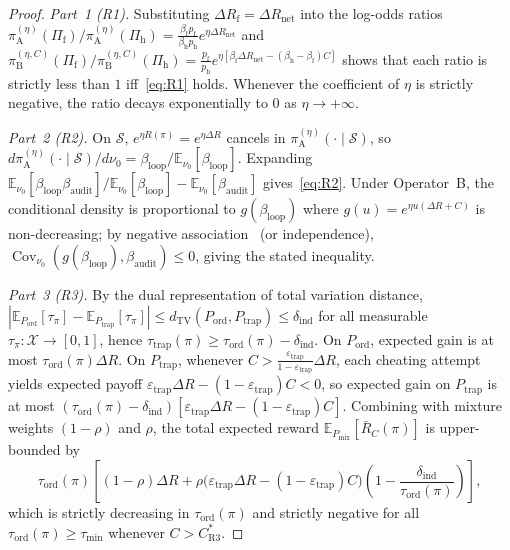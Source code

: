 \documentclass[11pt,a4paper]{article}
\newcommand{\E}{\mathbb{E}}
\newcommand{\Cov}{\operatorname{Cov}}
\newcommand{\dTV}{d_{\mathrm{TV}}}
\begin{document}
\begin{proof}
\emph{Part~1 (R1).} Substituting $\Delta R_{\mathrm{f}} = \Delta R_{\mathrm{net}}$ into the log-odds ratios $\pi_{\mathrm{A}}^{(\eta)}(\Pi_{\mathrm{f}})/\pi_{\mathrm{A}}^{(\eta)}(\Pi_{\mathrm{h}}) = \frac{\beta_{\mathrm{f}} p_{\mathrm{f}}}{\beta_{\mathrm{h}} p_{\mathrm{h}}} e^{\eta \Delta R_{\mathrm{net}}}$ and $\pi_{\mathrm{B}}^{(\eta, C)}(\Pi_{\mathrm{f}})/\pi_{\mathrm{B}}^{(\eta, C)}(\Pi_{\mathrm{h}}) = \frac{p_{\mathrm{f}}}{p_{\mathrm{h}}} e^{\eta[\beta_{\mathrm{f}}\Delta R_{\mathrm{net}} - (\beta_{\mathrm{h}}-\beta_{\mathrm{f}})C]}$ shows that each ratio is strictly less than $1$ iff~\eqref{eq:R1} holds. Whenever the coefficient of $\eta$ is strictly negative, the ratio decays exponentially to $0$ as $\eta \to +\infty$.

\emph{Part~2 (R2).} On $\mathcal{S}$, $e^{\eta R(\pi)} = e^{\eta \Delta R}$ cancels in $\pi_{\mathrm{A}}^{(\eta)}(\cdot \mid \mathcal{S})$, so $d\pi_{\mathrm{A}}^{(\eta)}(\cdot \mid \mathcal{S})/d\nu_0 = \beta_{\mathrm{loop}} / \E_{\nu_0}[\beta_{\mathrm{loop}}]$. Expanding $\E_{\nu_0}[\beta_{\mathrm{loop}}\beta_{\mathrm{audit}}]/\E_{\nu_0}[\beta_{\mathrm{loop}}] - \E_{\nu_0}[\beta_{\mathrm{audit}}]$ gives~\eqref{eq:R2}. Under Operator~B, the conditional density is proportional to $g(\beta_{\mathrm{loop}})$ where $g(u) = e^{\eta u (\Delta R + C)}$ is non-decreasing; by negative association~\cite{joagdev1983} (or independence), $\Cov_{\nu_0}(g(\beta_{\mathrm{loop}}), \beta_{\mathrm{audit}}) \le 0$, giving the stated inequality.

\emph{Part~3 (R3).} By the dual representation of total variation distance, $|\E_{P_{\mathrm{ord}}}[\tau_\pi] - \E_{P_{\mathrm{trap}}}[\tau_\pi]| \le \dTV(P_{\mathrm{ord}}, P_{\mathrm{trap}}) \le \delta_{\mathrm{ind}}$ for all measurable $\tau_\pi : \mathcal{X} \to [0, 1]$, hence $\tau_{\mathrm{trap}}(\pi) \ge \tau_{\mathrm{ord}}(\pi) - \delta_{\mathrm{ind}}$. On $P_{\mathrm{ord}}$, expected gain is at most $\tau_{\mathrm{ord}}(\pi)\Delta R$. On $P_{\mathrm{trap}}$, whenever $C > \frac{\varepsilon_{\mathrm{trap}}}{1-\varepsilon_{\mathrm{trap}}}\Delta R$, each cheating attempt yields expected payoff $\varepsilon_{\mathrm{trap}}\Delta R - (1-\varepsilon_{\mathrm{trap}})C < 0$, so expected gain on $P_{\mathrm{trap}}$ is at most $(\tau_{\mathrm{ord}}(\pi) - \delta_{\mathrm{ind}})[\varepsilon_{\mathrm{trap}}\Delta R - (1-\varepsilon_{\mathrm{trap}})C]$. Combining with mixture weights $(1-\rho)$ and $\rho$, the total expected reward $\E_{P_{\mathrm{mix}}}[\bar{R}_C(\pi)]$ is upper-bounded by
\[
  \tau_{\mathrm{ord}}(\pi)\left[(1-\rho)\Delta R + \rho\big(\varepsilon_{\mathrm{trap}}\Delta R - (1-\varepsilon_{\mathrm{trap}})C\big)\left(1 - \frac{\delta_{\mathrm{ind}}}{\tau_{\mathrm{ord}}(\pi)}\right)\right],
\]
which is strictly decreasing in $\tau_{\mathrm{ord}}(\pi)$ and strictly negative for all $\tau_{\mathrm{ord}}(\pi) \ge \tau_{\min}$ whenever $C > C_{\mathrm{R3}}^*$.
\end{proof}
\end{document}
